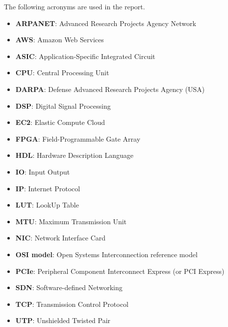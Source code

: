 The following acronyms are used in the report.
\begin{itemize}
  \item \textbf{ARPANET}: Advanced Research Projects Agency Network
  \item \textbf{AWS}: Amazon Web Services
  \item \textbf{ASIC}: Application-Specific Integrated Circuit
  \item \textbf{CPU}: Central Processing Unit
  \item \textbf{DARPA}: Defense Advanced Research Projects Agency (USA)
  \item \textbf{DSP}: Digital Signal Processing
  \item \textbf{EC2}: Elastic Compute Cloud
  \item \textbf{FPGA}: Field-Programmable Gate Array
  \item \textbf{HDL}: Hardware Description Language
  \item \textbf{IO}: Input Output
  \item \textbf{IP}: Internet Protocol
  \item \textbf{LUT}: LookUp Table
  \item \textbf{MTU}: Maximum Transmission Unit
  \item \textbf{NIC}: Network Interface Card
  \item \textbf{OSI model}: Open Systems Interconnection reference model
  \item \textbf{PCIe}: Peripheral Component Interconnect Express (or PCI Express)
  \item \textbf{SDN}: Software-defined Networking
  \item \textbf{TCP}: Transmission Control Protocol
  \item \textbf{UTP}: Unshielded Twisted Pair
\end{itemize}
